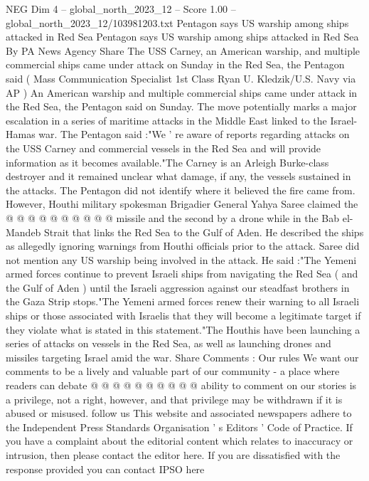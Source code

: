 \begin{textsample}{NEG Dim 4 – global\_north\_2023\_12 – Score 1.00 – global\_north\_2023\_12/103981203.txt}  \label{ex:f4_neg_157}
Pentagon says US warship among ships attacked in Red Sea Pentagon says US warship among ships attacked in Red Sea By PA News Agency Share The USS Carney, an American warship, and multiple commercial ships came under attack on Sunday in the Red Sea, the Pentagon said ( Mass Communication Specialist 1st Class Ryan U.
Kledzik/U.S.
Navy via AP ) An American warship and multiple commercial ships came under attack in the Red Sea, the Pentagon said on Sunday.
The move potentially marks a major escalation in a series of maritime attacks in the Middle East linked to the Israel-Hamas war.
The Pentagon said :"We ' re aware of reports regarding attacks on the USS Carney and commercial vessels in the Red Sea and will provide information as it becomes available."The Carney is an Arleigh Burke-class destroyer and it remained unclear what damage, if any, the vessels sustained in the attacks.
The Pentagon did not identify where it believed the fire came from.
However, Houthi military spokesman Brigadier General Yahya Saree claimed the @ @ @ @ @ @ @ @ @ @ missile and the second by a drone while in the Bab el-Mandeb Strait that links the Red Sea to the Gulf of Aden.
He described the ships as allegedly ignoring warnings from Houthi officials prior to the attack.
Saree did not mention any US warship being involved in the attack.
He said :"The Yemeni armed forces continue to prevent Israeli ships from navigating the Red Sea ( and the Gulf of Aden ) until the Israeli aggression against our steadfast brothers in the Gaza Strip stops."The Yemeni armed forces renew their warning to all Israeli ships or those associated with Israelis that they will become a legitimate target if they violate what is stated in this statement."The Houthis have been launching a series of attacks on vessels in the Red Sea, as well as launching drones and missiles targeting Israel amid the war.
Share Comments : Our rules We want our comments to be a lively and valuable part of our community - a place where readers can debate @ @ @ @ @ @ @ @ @ @ ability to comment on our stories is a privilege, not a right, however, and that privilege may be withdrawn if it is abused or misused. follow us This website and associated newspapers adhere to the Independent Press Standards Organisation ' s Editors ' Code of Practice.
If you have a complaint about the editorial content which relates to inaccuracy or intrusion, then please contact the editor here.
If you are dissatisfied with the response provided you can contact IPSO here

\end{textsample}

